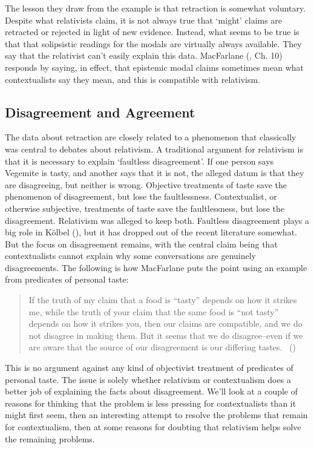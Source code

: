 \documentclass[
  11pt,
  letterpaper,
  DIV=11,
  numbers=noendperiod,
  twoside]{scrartcl}
\begin{document}
The lesson they draw from the example is that retraction is somewhat
voluntary. Despite what relativists claim, it is not always true that
`might' claims are retracted or rejected in light of new evidence.
Instead, what seems to be true is that that solipsistic readings for the
modals are virtually always available. They say that the relativist
can't easily explain this data. MacFarlane
(, Ch. 10) responds by saying, in
effect, that epistemic modal claims sometimes mean what contextualists
say they mean, and this is compatible with relativism.

\subsection{Disagreement and Agreement}\label{disagreementandagreement}

The data about retraction are closely related to a phenomenon that
classically was central to debates about relativism. A traditional
argument for relativism is that it is necessary to explain `faultless
disagreement'. If one person says Vegemite is tasty, and another says
that it is not, the alleged datum is that they are disagreeing, but
neither is wrong. Objective treatments of taste save the phenomenon of
disagreement, but lose the faultlessness. Contextualist, or otherwise
subjective, treatments of taste save the faultlessness, but lose the
disagreement. Relativism was alleged to keep both. Faultless
disagreement plays a big role in Kölbel
(), but it has dropped out of the recent
literature somewhat. But the focus on disagreement remains, with the
central claim being that contextualists cannot explain why some
conversations are genuinely disagreements. The following is how
MacFarlane puts the point using an example from predicates of personal
taste:

\begin{quote}
If the truth of my claim that a food is ``tasty'' depends on how it
strikes me, while the truth of your claim that the same food is ``not
tasty'' depends on how it strikes you, then our claims are compatible,
and we do not disagree in making them. But it seems that we do
disagree--even if we are aware that the source of our disagreement is
our differing tastes. ~()
\end{quote}

This is no argument against any kind of objectivist treatment of
predicates of personal taste. The issue is solely whether relativism or
contextualism does a better job of explaining the facts about
disagreement. We'll look at a couple of reasons for thinking that the
problem is less pressing for contextualists than it might first seem,
then an interesting attempt to resolve the problems that remain for
contextualism, then at some reasons for doubting that relativism helps
solve the remaining problems.
\end{document}
